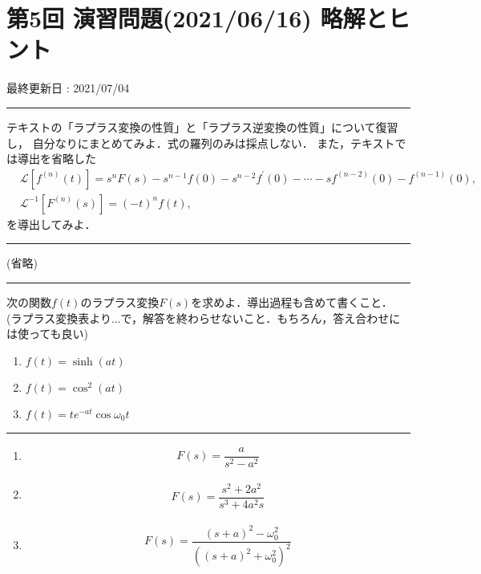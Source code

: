 \documentclass[11pt,a4]{jsarticle}
\numberwithin{equation}{section}
\begin{document}
%
\section*{第5回 演習問題(2021/06/16) 略解とヒント}
\begin{flushright}
 最終更新日 : 2021/07/04 
\end{flushright}
\hrule
\enshu
%
テキストの「ラプラス変換の性質」と「ラプラス逆変換の性質」について復習し，
自分なりにまとめてみよ．式の羅列のみは採点しない．
また，テキストでは導出を省略した
\begin{align*}
 &\mathcal{L}\left[f^{(n)}(t)\right] = s^n F(s) - s^{n-1}f(0) - s^{n-2}f^{\prime}(0) - \cdots -sf^{(n-2)}(0) - f^{(n-1)}(0), \\
 &\mathcal{L}^{-1}\left[F^{(n)}(s)\right] = (-t)^{n}f(t),
\end{align*}
を導出してみよ．
\vspace*{.2cm}
\hrule
\vspace*{.2cm}
(省略)
%
\newpage
%
\hrule
\enshu
%
次の関数$f(t)$のラプラス変換$F(s)$を求めよ．導出過程も含めて書くこと．
(ラプラス変換表より...で，解答を終わらせないこと．もちろん，答え合わせには使っても良い)
\begin{enumerate}[(1)]
  \item $f(t) = \sinh(at)$
  \item $f(t) = \cos^{2}(at)$
  \item $f(t) = te^{-at}\cos\omega_0 t$
\end{enumerate}
%
\hrule
\vspace*{.2cm}
\begin{enumerate}[(1)]
  \item 
    \begin{align*}
      F(s) = \dfrac{a}{s^2 - a^2}
    \end{align*}
  \item
    \begin{align*}
      F(s) = \dfrac{s^2 + 2a^2}{s^3 + 4a^2 s} 
    \end{align*}
  \item
    \begin{align*}
      F(s) = \dfrac{\left(s+a\right)^{2} - \omega_{0}^{2}}{\left((s+a)^2 + \omega_{0}^{2}\right)^{2}} 
    \end{align*}
\end{enumerate}
\end{document}
